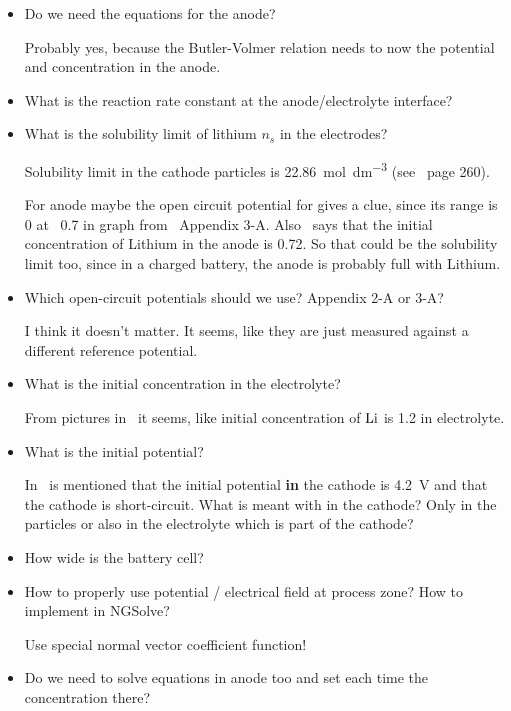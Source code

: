 \documentclass[a4paper,11pt]{scrartcl}
\newcommand*{\Li}{\ce{Li}}
\begin{document}
\begin{itemize}
\item Do we need the equations for the anode?

  Probably yes, because the Butler-Volmer relation needs to now the potential
  and concentration in the anode.

\item What is the reaction rate constant at the anode/electrolyte interface?

\item What is the solubility limit of lithium $n_s$ in the electrodes?

  Solubility limit in the cathode particles is \SI{22.86}{\mol\dm^{-3}}
  (see~\cite{garcia05} page 260).

  For anode maybe the open circuit potential for  gives a clue,
  since its range is 0 at ~0.7 in graph from~\cite{doyle95} Appendix 3-A.
  Also~\cite{garcia05} says that the initial concentration of Lithium in the
  anode is \num{0.72}.
  So that could be the solubility limit too, since in a charged battery, the
  anode is probably full with Lithium.

\item Which open-circuit potentials should we use? Appendix 2-A or 3-A?

  I think it doesn't matter.
  It seems, like they are just measured against a different reference potential.

\item What is the initial concentration in the electrolyte?

  From pictures in~\cite{garcia05} it seems, like initial concentration of $\Li$
  is \num{1.2} in electrolyte.

\item What is the initial potential?

  In~\cite{garcia05} is mentioned that the initial potential \textbf{in} the
  cathode is \SI{4.2}{\volt} and that the cathode is short-circuit.
  What is meant with in the cathode?
  Only in the particles or also in the electrolyte which is part of the cathode?

\item How wide is the battery cell?

\item How to properly use potential / electrical field at process zone?
  How to implement in NGSolve?

  Use special normal vector coefficient function!

\item Do we need to solve equations in anode too and set each time the concentration there?


\end{itemize}
\end{document}
